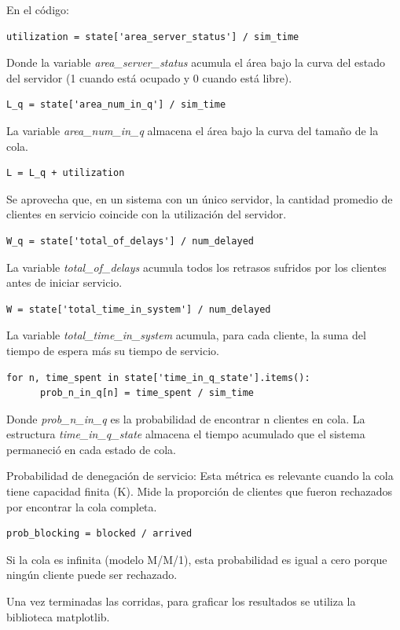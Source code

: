 \documentclass{article}
\begin{document}
En el código:
\begin{verbatim}
utilization = state['area_server_status'] / sim_time
\end{verbatim}
Donde la variable \textit{area\_server\_status} acumula el área bajo la curva del estado del servidor (1 cuando está ocupado y 0 cuando está libre).

\begin{verbatim}
L_q = state['area_num_in_q'] / sim_time
\end{verbatim}
La variable \textit{area\_num\_in\_q} almacena el área bajo la curva del tamaño de la cola.

\begin{verbatim}
L = L_q + utilization
\end{verbatim}
Se aprovecha que, en un sistema con un único servidor, la cantidad promedio de clientes en servicio coincide con la utilización del servidor.

\begin{verbatim}
W_q = state['total_of_delays'] / num_delayed
\end{verbatim}
La variable \textit{total\_of\_delays} acumula todos los retrasos sufridos por los clientes antes de iniciar servicio.

\begin{verbatim}
W = state['total_time_in_system'] / num_delayed
\end{verbatim}
La variable \textit{total\_time\_in\_system} acumula, para cada cliente, la suma del tiempo de espera más su tiempo de servicio.

\begin{verbatim}
for n, time_spent in state['time_in_q_state'].items():
      prob_n_in_q[n] = time_spent / sim_time
\end{verbatim}
Donde \textit{prob\_n\_in\_q} es la probabilidad de encontrar n clientes en cola. La estructura \textit{time\_in\_q\_state} almacena el tiempo acumulado que el sistema permaneció en cada estado de cola.

Probabilidad de denegación de servicio: Esta métrica es relevante cuando la cola tiene capacidad finita (K). Mide la proporción de clientes que fueron rechazados por encontrar la cola completa.
\begin{verbatim}
prob_blocking = blocked / arrived
\end{verbatim}
Si la cola es infinita (modelo M/M/1), esta probabilidad es igual a cero porque ningún cliente puede ser rechazado.

Una vez terminadas las corridas, para graficar los resultados se utiliza la biblioteca matplotlib.
\end{document}
